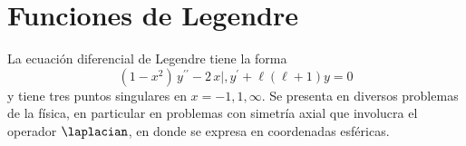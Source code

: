 \section{Funciones de Legendre}
La ecuación diferencial de Legendre tiene la forma
\begin{equation}
(1 - x^{2}) \, y^{\prime \prime} - 2 \, x |, y^{\prime} + \ell (\ell + 1) y = 0
\label{eq:ecuacion_001}
\end{equation}
y tiene tres puntos singulares en $x = -1, 1, \infty$. Se presenta en diversos problemas de la física, en particular en problemas con simetría axial que involucra el operador $\laplacian$, en donde se expresa en coordenadas esféricas.
